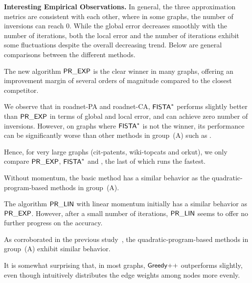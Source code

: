 \noindent \textbf{Interesting Empirical Observations.}
In general, the three approximation metrics are consistent with each other, where in some graphs, the number of inversions can reach 0. While the global error decreases smoothly with the number of iterations, both the local error and the number of iterations exhibit some fluctuations despite the overall decreasing trend.
Below are general comparisons between the different methods.

\begin{compactitem}

\item The new algorithm $\mathsf{PR\_EXP}$ is the clear winner 
in many graphs, offering an improvement margin of several orders of magnitude compared to the closest competitor.

We observe that in roadnet-PA and roadnet-CA, $\mathsf{FISTA}^*$ performs slightly better 
than $\mathsf{PR\_EXP}$ in terms of global and local error, and can achieve zero number of inversions.  However, on graphs where $\mathsf{FISTA}^*$ is not the winner, its performance can be significantly worse than other
methods in group~(A) such as \elist.

Hence, for very large graphs (cit-patents, wiki-topcats and orkut), we only compare $\mathsf{PR\_EXP}$, $\mathsf{FISTA}^*$
and \elist, the last of which runs the fastest.


\item Without momentum, the basic \pr method has a similar behavior as
the quadratic-program-based methods in group~(A).

The algorithm $\mathsf{PR\_LIN}$ with linear momentum
initially has a similar behavior as $\mathsf{PR\_EXP}$.
However, after a small number of iterations,
$\mathsf{PR\_LIN}$ seems to offer no further progress on the accuracy.

\item 
As corroborated in the previous study~\cite{DBLP:conf/nips/HarbQC22},
the quadratic-program-based methods in group~(A) exhibit similar behavior. 

\item It is somewhat surprising that, in most graphs, $\mbox{\ensuremath{\mathsf{Greedy}}++}$ outperforms \elist slightly, even though \elist intuitively distributes the edge weights among nodes more evenly.



\end{compactitem}



